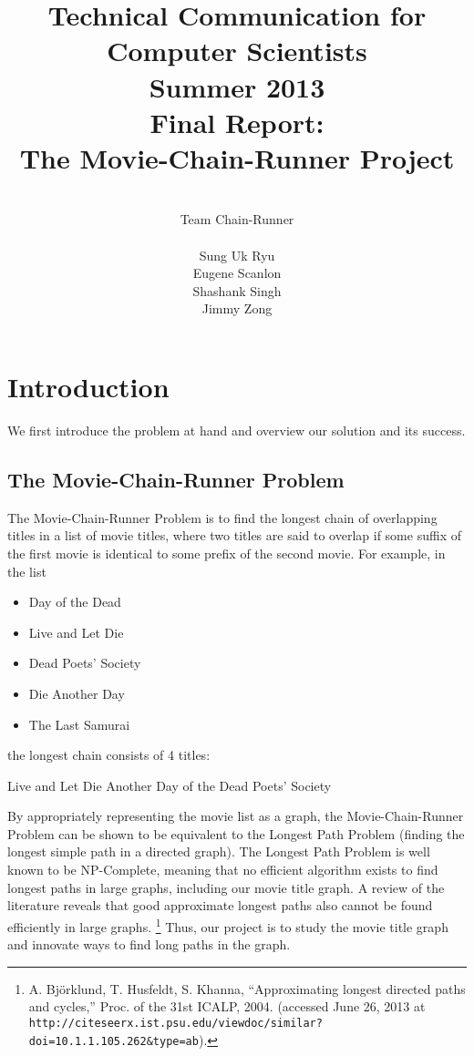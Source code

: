 \documentclass[11pt,english]{article}
\title{
{\normalsize \bf Technical Communication for Computer Scientists\\
Summer 2013}\\
\vspace{4cm}
{\bf Final Report:\\The Movie-Chain-Runner Project}}
\author{
\\Team Chain-Runner \\\\
Sung Uk Ryu\\
Eugene Scanlon\\
Shashank Singh\\
Jimmy Zong
}
\begin{document}


\tableofcontents

\newpage
{} %
\section{Introduction}
We first introduce the problem at hand and overview our solution and its
success.

\subsection{The Movie-Chain-Runner Problem}
The Movie-Chain-Runner Problem is to find the longest chain of overlapping
titles in a list of movie titles, where two titles are said to overlap if some
suffix of the first movie is identical to some prefix of the second movie. For
example, in the list
\begin{itemize}[noitemsep]
\item Day of the Dead
\item Live and Let Die
\item Dead Poets' Society
\item Die Another Day
\item The Last Samurai
\end{itemize}
the longest chain consists of 4 titles:

\begin{center}
Live and Let Die Another Day of the Dead Poets' Society
\end{center}

By appropriately representing the movie list as a graph, the Movie-Chain-Runner
Problem can be shown to be equivalent to the Longest Path Problem (finding the
longest simple path in a directed graph). The Longest Path Problem is well
known to be NP-Complete, meaning that no efficient algorithm exists to find
longest paths in large graphs, including our movie title graph. A review of the
literature reveals that good approximate longest paths also cannot be found
efficiently in large graphs.\hspace{-0.2cm}
\footnote{
A. Bj\"{o}rklund, T. Husfeldt, S. Khanna, ``Approximating longest directed
paths and cycles,'' Proc. of the 31st ICALP, 2004. (accessed June 26, 2013 at
\texttt{
http://citeseerx.ist.psu.edu/viewdoc/similar?doi=10.1.1.105.262\&type=ab}).}
Thus, our project is to study the movie title
graph and innovate ways to find long paths in the graph.
\end{document}
